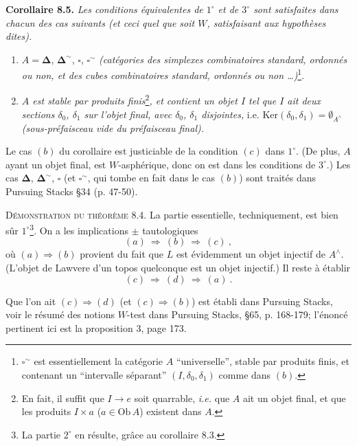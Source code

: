 \documentclass[11pt]{article}
\newcommand{\printedpage}[1]{\marginpar{\footnotesize p.~#1}}
\newcommand{\msp}[1]{\marginpar{\footnotesize [#1]}}
\newcommand{\Simp}{\boldsymbol{\Delta}}
\newcommand{\Cub}{\square}
\begin{document}
\textbf{Corollaire 8.5.} \textit{Les conditions équivalentes de $1^\circ$ et de $3^\circ$ sont satisfaites dans chacun des cas suivants (et ceci quel que soit $W$, satisfaisant aux hypothèses dites).}
\begin{enumerate}[leftmargin=2.5em]
\item[a)] $A = \Simp$, $\Simp^{\sim}$, $\Cub$, $\Cub^{\sim}$ \textit{(catégories des simplexes combinatoires standard, ordonnés ou non, et des cubes combinatoires standard, ordonnés ou non \ldots)}\footnote[39]{$\Cub^{\sim}$ est essentiellement la catégorie $A$ “universelle”, stable par produits finis, et contenant un “intervalle séparant” $(I,\delta_0,\delta_1)$ comme dans $(b)$.}.
\item[b)] \textit{$A$ est stable par produits finis}\footnote[40]{En fait, il suffit que $I \longrightarrow e$ soit quarrable, \textit{i.e.} que $A$ ait un objet final, et que les produits $I \times a$ ($a \in \mathrm{Ob}\,A$) existent dans $A$.}\textit{, et contient un objet $I$ tel que $I$ ait deux sections $\delta_0$, $\delta_1$ sur l'objet final, avec $\delta_0$, $\delta_1$ disjointes,} i.e. $\mathrm{Ker}(\delta_0,\delta_1) = \emptyset_{A^\wedge}$ \textit{(sous-préfaisceau vide du préfaisceau final).}
\end{enumerate}

\msp{page 108}

Le cas $(b)$ du corollaire est justiciable de la condition $(c)$ dans $1^\circ$. (De plus, $A$ ayant un objet final, est $W$-asphérique, donc on est dans les conditions de $3^\circ$.) Les cas $\Simp$, $\Simp^{\sim}$, $\Cub$ (et $\Cub^{\sim}$, qui tombe en fait dans le cas $(b)$) sont traités dans Pursuing Stacks \S34 (p. 47-50).

\textsc{Démonstration du théorème} 8.4. La partie essentielle, techniquement, est bien sûr $1^\circ$\footnote[41]{La partie $2^\circ$ en résulte, grâce au corollaire 8.3.}. On a les implications $\pm$ tautologiques
\[
(a) \ \Longrightarrow\ (b) \ \Longrightarrow\ (c)\ ,
\]
où $(a) \Longrightarrow (b)$ provient du fait que $L$ est évidemment un objet injectif de $A^\wedge$. (L'objet de Lawvere d'un topos quelconque est un objet injectif.) Il reste à établir
\[
(c) \ \Longrightarrow\ (d) \ \Longrightarrow\ (a)\ .
\]

\printedpage{60}

Que l'on ait $(c) \Longrightarrow (d)$ (et $(c) \Longrightarrow (b)$) est établi dans Pursuing Stacks, voir le résumé des notions $W$-test dans Pursuing Stacks, \S65, p. 168-179; l'énoncé pertinent ici est la proposition 3, page 173.
\end{document}
